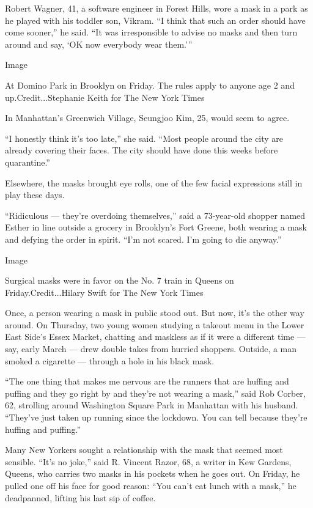 Robert Wagner, 41, a software engineer in Forest Hills, wore a mask in a
park as he played with his toddler son, Vikram. ``I think that such an
order should have come sooner,'' he said. ``It was irresponsible to
advise no masks and then turn around and say, `OK now everybody wear
them.'''

Image

At Domino Park in Brooklyn on Friday. The rules apply to anyone age 2
and up.Credit...Stephanie Keith for The New York Times

In Manhattan's Greenwich Village, Seungjoo Kim, 25, would seem to agree.

``I honestly think it's too late,'' she said. ``Most people around the
city are already covering their faces. The city should have done this
weeks before quarantine.''

Elsewhere, the masks brought eye rolls, one of the few facial
expressions still in play these days.

``Ridiculous --- they're overdoing themselves,'' said a 73-year-old
shopper named Esther in line outside a grocery in Brooklyn's Fort
Greene, both wearing a mask and defying the order in spirit. ``I'm not
scared. I'm going to die anyway.''

Image

Surgical masks were in favor on the No. 7 train in Queens on
Friday.Credit...Hilary Swift for The New York Times

Once, a person wearing a mask in public stood out. But now, it's the
other way around. On Thursday, two young women studying a takeout menu
in the Lower East Side's Essex Market, chatting and maskless as if it
were a different time --- say, early March --- drew double takes from
hurried shoppers. Outside, a man smoked a cigarette --- through a hole
in his black mask.

``The one thing that makes me nervous are the runners that are huffing
and puffing and they go right by and they're not wearing a mask,'' said
Rob Corber, 62, strolling around Washington Square Park in Manhattan
with his husband. ``They've just taken up running since the lockdown.
You can tell because they're huffing and puffing.''

Many New Yorkers sought a relationship with the mask that seemed most
sensible. ``It's no joke,'' said R. Vincent Razor, 68, a writer in Kew
Gardens, Queens, who carries two masks in his pockets when he goes out.
On Friday, he pulled one off his face for good reason: ``You can't eat
lunch with a mask,'' he deadpanned, lifting his last sip of coffee.

